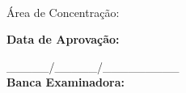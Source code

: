 \begin{folhadeaprovacao}
  \begin{center}
    {\normalsize \MakeUppercase{\imprimirautor}}
        \vspace*{2.5cm}
    \begin{center}
      \normalsize \textbf{\imprimirtitulo}
    \end{center}
    \vspace*{2.5cm}
    \hspace{.45\textwidth}
    \begin{minipage}{.5\textwidth}
        \imprimirpreambulo\\
        \par
        Área de Concentração: 
    \end{minipage}%
  \end{center}
  \vspace*{2cm}
\centering
  \textbf{Data de Aprovação:}\\
  \par
  \_\_\_\_\_/\_\_\_\_\_/\_\_\_\_\_\_\_\_\_ \\
  \vspace{1.5cm}
  \textbf{Banca Examinadora:}
  \assinatura{\textbf{\titulacaoorientador \ \imprimirorientador} \\ \imprimirorientadorRotulo} 
\end{folhadeaprovacao}